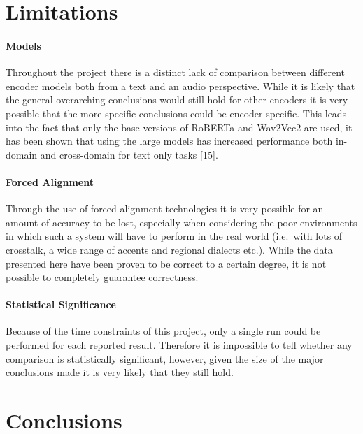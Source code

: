 \documentclass[twocolumn]{article}
\begin{document}
\section{Limitations}\label{sec:limitations}

\paragraph{Models}\label{models}

Throughout the project there is a distinct lack of comparison between
different encoder models both from a text and an audio perspective.
While it is likely that the general overarching conclusions would still
hold for other encoders it is very possible that the more specific
conclusions could be encoder-specific. This leads into the fact that
only the base versions of RoBERTa and Wav2Vec2 are used, it has been
shown that using the large models has increased performance both
in-domain and cross-domain for text only tasks {[}15{]}.

\paragraph{Forced Alignment}\label{forced-alignment-1}

Through the use of forced alignment technologies it is very possible for
an amount of accuracy to be lost, especially when considering the poor
environments in which such a system will have to perform in the real
world (i.e.~with lots of crosstalk, a wide range of accents and regional
dialects etc.). While the data presented here have been proven to be
correct to a certain degree, it is not possible to completely guarantee
correctness.

\paragraph{Statistical Significance}\label{statistical-significance}

Because of the time constraints of this project, only a single run could
be performed for each reported result. Therefore it is impossible to
tell whether any comparison is statistically significant, however, given
the size of the major conclusions made it is very likely that they still
hold.

\section{Conclusions}\label{conclusions}
\end{document}
